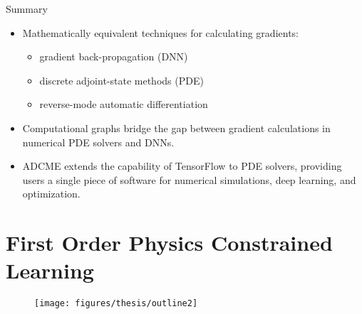 \documentclass[usenames,dvipsnames]{beamer}
\begin{document}
\begin{frame}{Summary}

\begin{itemize}
\item Mathematically equivalent techniques for calculating gradients:

\begin{itemize}
\item gradient back-propagation (DNN)
\item discrete adjoint-state methods (PDE)
\item reverse-mode automatic differentiation
\end{itemize}

\item Computational graphs bridge the gap between gradient calculations in numerical PDE solvers and DNNs. 

\item ADCME extends the capability of TensorFlow to PDE solvers, providing users a single piece of software for numerical simulations, deep learning, and optimization.


\end{itemize}

\end{frame}

\section{First Order Physics Constrained Learning}

\begin{frame}	
	
	\begin{figure}[hbt]
		\centering
		\texttt{[image: figures/thesis/outline2]}
	\end{figure}
\end{frame}
\end{document}
